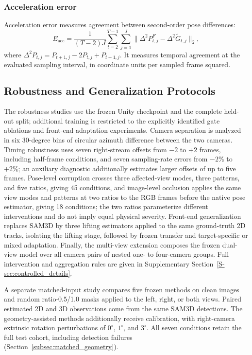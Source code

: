 \documentclass[preprint,12pt]{elsarticle}
\begin{document}
\subsubsection{Acceleration error}
Acceleration error measures agreement between second-order pose differences:
\[
E_{\mathrm{acc}}=\frac{1}{(T-2)J}\sum_{t=2}^{T-1}\sum_{j=1}^{J}
\|\Delta^2 P^F_{t,j}-\Delta^2\tilde{G}_{t,j}\|_2,
\]
where \(\Delta^2 P_{t,j}=P_{t+1,j}-2P_{t,j}+P_{t-1,j}\). It measures temporal agreement at the evaluated sampling interval, in coordinate units per sampled frame squared.

\subsection{Robustness and Generalization Protocols}
\label{subsec:controlled_protocol}

The robustness studies use the frozen Unity checkpoint and the complete held-out split; additional training is restricted to the explicitly identified gate ablations and front-end adaptation experiments. Camera separation is analyzed in six 30-degree bins of circular azimuth difference between the two cameras. Timing robustness uses seven right-stream offsets from \(-2\) to \(+2\) frames, including half-frame conditions, and seven sampling-rate errors from \(-2\%\) to \(+2\%\); an auxiliary diagnostic additionally estimates larger offsets of up to five frames. Pose-level corruption crosses three affected-view modes, three patterns, and five ratios, giving 45 conditions, and image-level occlusion applies the same view modes and patterns at two ratios to the RGB frames before the native pose estimator, giving 18 conditions; the two ratios parameterize different interventions and do not imply equal physical severity. Front-end generalization replaces SAM3D by three lifting estimators applied to the same ground-truth 2D tracks, isolating the lifting stage, followed by frozen transfer and target-specific or mixed adaptation. Finally, the multi-view extension composes the frozen dual-view model over all camera pairs of nested one- to four-camera groups. Full intervention and aggregation rules are given in Supplementary Section~\ref{S-sec:controlled_details}.

A separate matched-input study compares five frozen methods on clean images and random ratio-0.5/1.0 masks applied to the left, right, or both views. Paired estimated 2D and 3D observations come from the same SAM3D detections. The geometry-assisted methods additionally receive calibration, with right-camera extrinsic rotation perturbations of $0^\circ$, $1^\circ$, and $3^\circ$. All seven conditions retain the full test cohort, including detection failures (Section~\ref{subsec:matched_geometry}).
\end{document}
